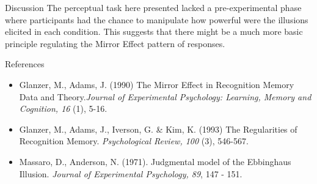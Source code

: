 \documentclass[final]{beamer}
\newlength{\onecolwid}
\begin{document}
\begin{frame}[t]
\begin{columns}[t]
\begin{column}{\onecolwid}
\begin{alertblock}{Discussion}
The perceptual task here presented lacked a pre-experimental phase where participants had the chance to manipulate how powerful were the illusions elicited in each condition. This suggests that there might be a much more basic principle regulating the Mirror Effect pattern of responses.

\end{alertblock}


\begin{alertblock}{References}

\begin{itemize}
\item Glanzer, M., Adams, J. (1990) The Mirror Effect in Recognition Memory \: Data and Theory.\textit{Journal of Experimental Psychology: Learning, Memory and Cognition, 16} (1), 5-16.
\item Glanzer, M., Adams, J., Iverson, G. \& Kim, K. (1993) The Regularities of Recognition Memory. \textit{Psychological Review, 100} (3), 546-567.
\item Massaro, D., Anderson, N. (1971). Judgmental model of the Ebbinghaus Illusion. \textit{Journal of Experimental Psychology, 89}, 147 - 151.
\end{itemize}


\end{alertblock}



\end{column} %
\end{columns} %
\end{frame} %
\end{document}
